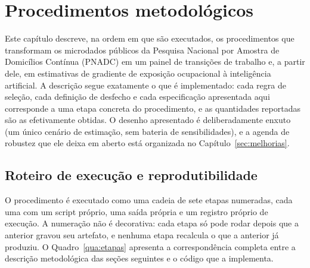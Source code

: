 \section{Procedimentos metodológicos}
\label{sec:metodo}

Este capítulo descreve, na ordem em que são executados, os procedimentos que
transformam os microdados públicos da Pesquisa Nacional por Amostra de
Domicílios Contínua (PNADC) em um painel de transições de trabalho e, a partir
dele, em estimativas de gradiente de exposição ocupacional à inteligência
artificial. A descrição segue exatamente o que é implementado: cada regra de
seleção, cada definição de desfecho e cada especificação apresentada aqui
corresponde a uma etapa concreta do procedimento, e as quantidades reportadas
são as efetivamente obtidas. O desenho apresentado é deliberadamente enxuto
(um único cenário de estimação, sem bateria de sensibilidades), e a agenda de
robustez que ele deixa em aberto está organizada no Capítulo~\ref{sec:melhorias}.

\subsection{Roteiro de execução e reprodutibilidade}
\label{sec:roteiro}

O procedimento é executado como uma cadeia de sete etapas numeradas, cada uma
com um script próprio, uma saída própria e um registro próprio de execução. A
numeração não é decorativa: cada etapa só pode rodar depois que a anterior
gravou seu artefato, e nenhuma etapa recalcula o que a anterior já produziu. O
Quadro~\ref{qua:etapas} apresenta a correspondência completa entre a descrição
metodológica das seções seguintes e o código que a implementa.

